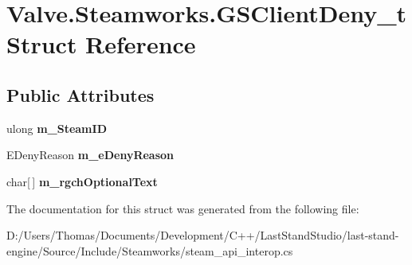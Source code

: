 \hypertarget{structValve_1_1Steamworks_1_1GSClientDeny__t}{}\section{Valve.\+Steamworks.\+G\+S\+Client\+Deny\+\_\+t Struct Reference}
\label{structValve_1_1Steamworks_1_1GSClientDeny__t}
\subsection*{Public Attributes}
\begin{DoxyCompactItemize}
\item 
\hypertarget{structValve_1_1Steamworks_1_1GSClientDeny__t_a3cbe1b68a2ebba730c90cbbcf9e8a5b6}{}ulong {\bfseries m\+\_\+\+Steam\+I\+D}\label{structValve_1_1Steamworks_1_1GSClientDeny__t_a3cbe1b68a2ebba730c90cbbcf9e8a5b6}

\item 
\hypertarget{structValve_1_1Steamworks_1_1GSClientDeny__t_ab61de9a5ac4d05a2d6fac69b6c6a8111}{}E\+Deny\+Reason {\bfseries m\+\_\+e\+Deny\+Reason}\label{structValve_1_1Steamworks_1_1GSClientDeny__t_ab61de9a5ac4d05a2d6fac69b6c6a8111}

\item 
\hypertarget{structValve_1_1Steamworks_1_1GSClientDeny__t_afc774dc5e1219fb75c604b1571fbabf8}{}char\mbox{[}$\,$\mbox{]} {\bfseries m\+\_\+rgch\+Optional\+Text}\label{structValve_1_1Steamworks_1_1GSClientDeny__t_afc774dc5e1219fb75c604b1571fbabf8}

\end{DoxyCompactItemize}


The documentation for this struct was generated from the following file\+:\begin{DoxyCompactItemize}
\item 
D\+:/\+Users/\+Thomas/\+Documents/\+Development/\+C++/\+Last\+Stand\+Studio/last-\/stand-\/engine/\+Source/\+Include/\+Steamworks/steam\+\_\+api\+\_\+interop.\+cs\end{DoxyCompactItemize}
